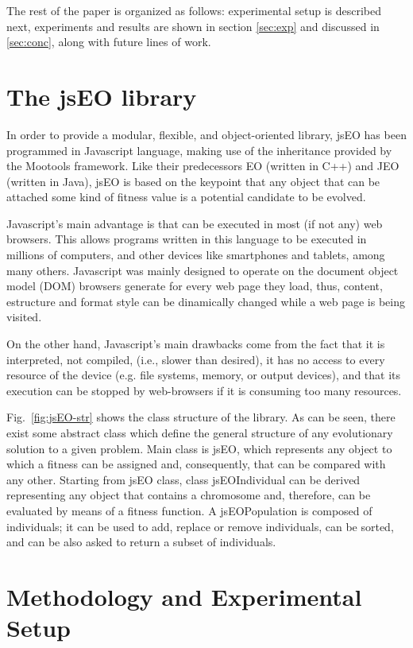 \documentclass{llncs}
\begin{document}
The rest of the paper is organized as follows: experimental setup is described next,  experiments and results are shown in section 
\ref{sec:exp} and discussed in \ref{sec:conc}, along with future lines
of work. 

\section{The jsEO library}
\label{sec:jseo}
In order to provide a modular, flexible, and object-oriented library, jsEO has been programmed in Javascript language, making use of the inheritance provided by the Mootools framework. Like their predecessors EO (written in C++) and JEO (written in Java), jsEO is based on the keypoint that any object that can be attached some kind of fitness value is a potential candidate to be evolved.

Javascript's main advantage is that can be executed in most (if not any) web browsers. This allows programs written in this language to be executed in millions of computers, and other devices like smartphones and tablets, among many others. Javascript was mainly designed to operate on the document object model (DOM) browsers generate for every web page they load, thus, content, estructure and format style can be dinamically changed while a web page is being visited.

On the other hand, Javascript's main drawbacks come from the fact that it is interpreted, not compiled, (i.e., slower than desired), it has no access to every resource of the device (e.g. file systems,  memory, or output devices), and that its execution can be stopped by web-browsers if it is consuming too many resources.

Fig.~\ref{fig:jsEO-str} shows the class structure of the library. As can be seen, there exist some abstract class which define the general structure of any evolutionary solution to a given problem. Main class is jsEO, which represents any object to which a fitness can be assigned and, consequently, that can be compared with any other. Starting from jsEO class, class jsEOIndividual can be derived representing any object that contains a chromosome and, therefore, can be evaluated by means of a fitness function. A jsEOPopulation is composed of individuals; it can be used to add, replace or remove individuals, can be sorted, and can be also asked to return a subset of individuals.


\section{Methodology and Experimental Setup}
\label{sec:method}
\end{document}
